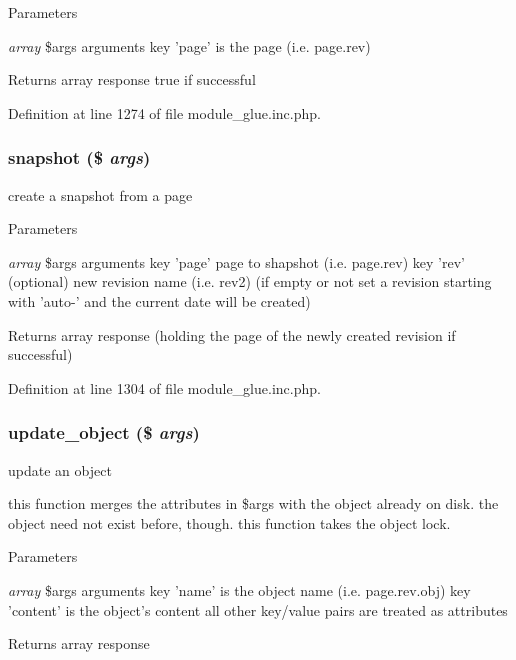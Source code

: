 \begin{DoxyParams}{Parameters}
\item[{\em array}]\$args arguments key 'page' is the page (i.e. page.rev) \end{DoxyParams}
\begin{DoxyReturn}{Returns}
array response true if successful 
\end{DoxyReturn}


Definition at line 1274 of file module\_\-glue.inc.php.

\hypertarget{module__glue_8inc_8php_a5d3ad02088eee566589cd47fe0dc889a}{
\subsubsection[{snapshot}]{\setlength{\rightskip}{0pt plus 5cm}snapshot (\$ {\em args})}}
\label{module__glue_8inc_8php_a5d3ad02088eee566589cd47fe0dc889a}
create a snapshot from a page


\begin{DoxyParams}{Parameters}
\item[{\em array}]\$args arguments key 'page' page to shapshot (i.e. page.rev) key 'rev' (optional) new revision name (i.e. rev2) (if empty or not set a revision starting with 'auto-\/' and the current date will be created) \end{DoxyParams}
\begin{DoxyReturn}{Returns}
array response (holding the page of the newly created revision if successful) 
\end{DoxyReturn}


Definition at line 1304 of file module\_\-glue.inc.php.

\hypertarget{module__glue_8inc_8php_a4aed316adcde13b40c9fc1b35e6537a4}{
\subsubsection[{update\_\-object}]{\setlength{\rightskip}{0pt plus 5cm}update\_\-object (\$ {\em args})}}
\label{module__glue_8inc_8php_a4aed316adcde13b40c9fc1b35e6537a4}
update an object

this function merges the attributes in \$args with the object already on disk. the object need not exist before, though. this function takes the object lock. 
\begin{DoxyParams}{Parameters}
\item[{\em array}]\$args arguments key 'name' is the object name (i.e. page.rev.obj) key 'content' is the object's content all other key/value pairs are treated as attributes \end{DoxyParams}
\begin{DoxyReturn}{Returns}
array response 
\end{DoxyReturn}



